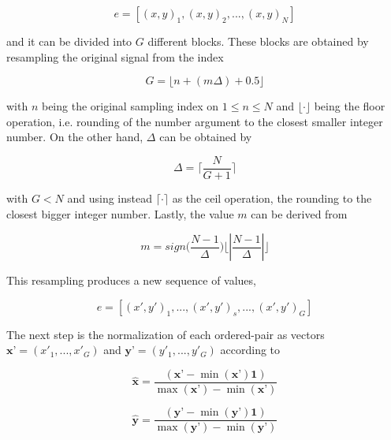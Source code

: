 \documentclass[brainsci,article,submit,moreauthors,pdftex,10pt,a4paper]{mdpi}
\begin{document}
\begin{equation}
e = \left[ (x,y)_{1}, (x,y)_{2}, ..., (x,y)_{N} \right]
\label{eq:shccdelta}
\end{equation}

\noindent and it can be divided into $G$ different blocks.  These blocks are obtained by resampling the original signal from the index 

\begin{equation}
G = \lfloor n + ( m \Delta ) + 0.5 \rfloor
\label{eq:shcc2}
\end{equation}

\noindent with $n$ being the original sampling index on $ 1 \leq n \leq N $ and $\lfloor \cdot \rfloor$ being the floor operation, i.e. rounding of the number argument to the closest smaller integer number.  On the other hand, $\Delta$ can be obtained by

\begin{equation}
\Delta = \bigg \lceil \frac{N}{G+1} \bigg \rceil
\label{eq:shcc3}
\end{equation}

\noindent with $ G < N $ and using instead $\lceil \cdot \rceil$ as the ceil operation, the rounding to the closest bigger integer number. Lastly, the value $m$ can be derived from

\begin{equation}
m = sign \bigg (  \frac{N-1}{\Delta} \bigg )  \bigg \lfloor \left\lvert \frac{N-1}{\Delta} \right\lvert \bigg \rfloor
\label{eq:shcc4}
\end{equation}

This resampling produces a new sequence of values,

\begin{equation}
e = \left[ (x',y')_{1}, ...,(x',y')_{s}, ..., (x',y')_{G} \right]
\label{eq:shcc5}
\end{equation}

The next step is the normalization of each ordered-pair as vectors $\textbf{x'} = (x'_{1},...,x'_{G})$ and $\textbf{y'} = (y'_{1},...,y'_{G})$ according to

\begin{equation}
\hat{\textbf{x}} = \frac{( \textbf{x'} - \min(\textbf{x'}) \textbf{1} )}{\max(\textbf{x'}) - \min(\textbf{x'})} 
\label{eq:shcc6}
\end{equation}

\begin{equation}
\hat{\textbf{y}} = \frac{( \textbf{y'} - \min(\textbf{y'}) \textbf{1} )}{\max(\textbf{y'}) - \min(\textbf{y'})} 
\label{eq:shcc7}
\end{equation}
\end{document}
